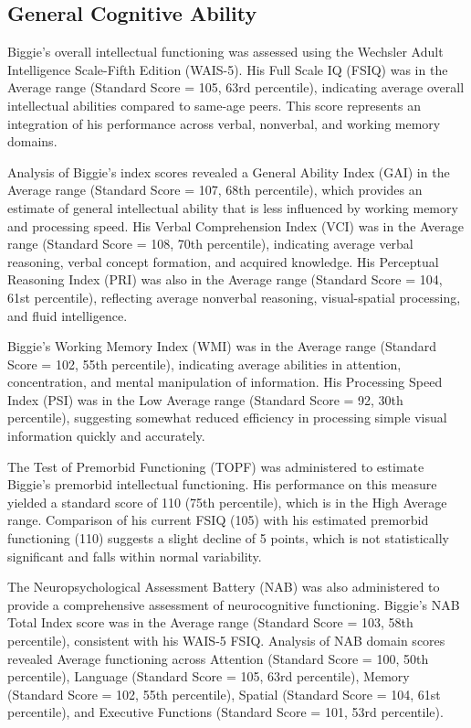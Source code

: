 \documentclass[
  letterpaper,
  DIV=11,
  numbers=noendperiod]{scrartcl}
\begin{document}
\subsection{General Cognitive Ability}\label{sec-iq}

Biggie's overall intellectual functioning was assessed using the
Wechsler Adult Intelligence Scale-Fifth Edition (WAIS-5). His Full Scale
IQ (FSIQ) was in the Average range (Standard Score = 105, 63rd
percentile), indicating average overall intellectual abilities compared
to same-age peers. This score represents an integration of his
performance across verbal, nonverbal, and working memory domains.

Analysis of Biggie's index scores revealed a General Ability Index (GAI)
in the Average range (Standard Score = 107, 68th percentile), which
provides an estimate of general intellectual ability that is less
influenced by working memory and processing speed. His Verbal
Comprehension Index (VCI) was in the Average range (Standard Score =
108, 70th percentile), indicating average verbal reasoning, verbal
concept formation, and acquired knowledge. His Perceptual Reasoning
Index (PRI) was also in the Average range (Standard Score = 104, 61st
percentile), reflecting average nonverbal reasoning, visual-spatial
processing, and fluid intelligence.

Biggie's Working Memory Index (WMI) was in the Average range (Standard
Score = 102, 55th percentile), indicating average abilities in
attention, concentration, and mental manipulation of information. His
Processing Speed Index (PSI) was in the Low Average range (Standard
Score = 92, 30th percentile), suggesting somewhat reduced efficiency in
processing simple visual information quickly and accurately.

The Test of Premorbid Functioning (TOPF) was administered to estimate
Biggie's premorbid intellectual functioning. His performance on this
measure yielded a standard score of 110 (75th percentile), which is in
the High Average range. Comparison of his current FSIQ (105) with his
estimated premorbid functioning (110) suggests a slight decline of 5
points, which is not statistically significant and falls within normal
variability.

The Neuropsychological Assessment Battery (NAB) was also administered to
provide a comprehensive assessment of neurocognitive functioning.
Biggie's NAB Total Index score was in the Average range (Standard Score
= 103, 58th percentile), consistent with his WAIS-5 FSIQ. Analysis of
NAB domain scores revealed Average functioning across Attention
(Standard Score = 100, 50th percentile), Language (Standard Score = 105,
63rd percentile), Memory (Standard Score = 102, 55th percentile),
Spatial (Standard Score = 104, 61st percentile), and Executive Functions
(Standard Score = 101, 53rd percentile).
\end{document}
